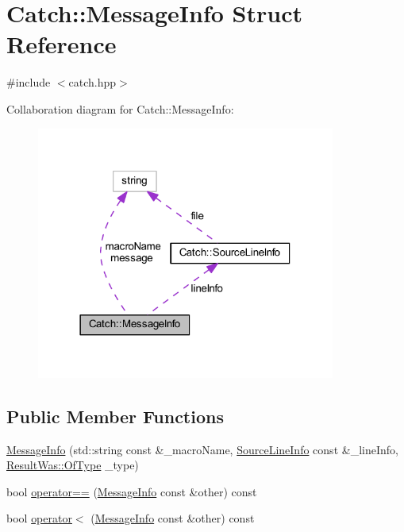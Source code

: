 \hypertarget{struct_catch_1_1_message_info}{}\section{Catch\+:\+:Message\+Info Struct Reference}
\label{struct_catch_1_1_message_info}


{\ttfamily \#include $<$catch.\+hpp$>$}



Collaboration diagram for Catch\+:\+:Message\+Info\+:\nopagebreak
\begin{figure}[H]
\begin{center}
\leavevmode
\includegraphics[width=278pt]{struct_catch_1_1_message_info__coll__graph}
\end{center}
\end{figure}
\subsection*{Public Member Functions}
\begin{DoxyCompactItemize}
\item 
\hyperlink{struct_catch_1_1_message_info_a2e336c33ebef7af3c1bbae6a56e14f8a}{Message\+Info} (std\+::string const \&\+\_\+macro\+Name, \hyperlink{struct_catch_1_1_source_line_info}{Source\+Line\+Info} const \&\+\_\+line\+Info, \hyperlink{struct_catch_1_1_result_was_a624e1ee3661fcf6094ceef1f654601ef}{Result\+Was\+::\+Of\+Type} \+\_\+type)
\item 
bool \hyperlink{struct_catch_1_1_message_info_af4b37f2172ba55395813b4bb6bbbde1a}{operator==} (\hyperlink{struct_catch_1_1_message_info}{Message\+Info} const \&other) const
\item 
bool \hyperlink{struct_catch_1_1_message_info_a8254cb8fca2da02a29a9843cdcb79df1}{operator$<$} (\hyperlink{struct_catch_1_1_message_info}{Message\+Info} const \&other) const
\end{DoxyCompactItemize}
